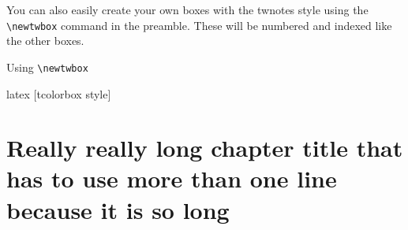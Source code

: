 \documentclass[math,code,cn,localfonts]{twnotes} %
\begin{document}
	You can also easily create your own boxes with the twnotes style using the \texttt{\textbackslash newtwbox} command in the preamble. These will be numbered and indexed like the other boxes.
	
\begin{codebox}{Using \texttt{\textbackslash newtwbox}}{}
\begin{twcode}{latex}
[tcolorbox style]
\end{twcode}
\end{codebox}
	
	\chapter{Really really long chapter title that has to use more than one line because it is so long}
	\lipsum[100]
	\lipsum[101]
	
	\lipsum[102]
	
	\begin{notebox}
		\lipsum[21]
	\end{notebox}
	
	\lipsum[104]
	
	
	\twindex
	
\end{document}
